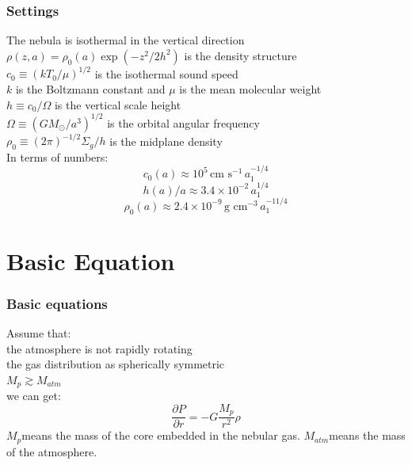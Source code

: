 \documentclass{beamer}
\begin{document}
\begin{frame}
\frametitle{Settings}
The nebula is isothermal in the vertical direction\\ 
$\rho(z,a) = \rho_0(a) \exp(-z^2/2h^2)$ is the density structure\\ 
$c_0 \equiv (kT_0/\mu)^{1/2}$ is the isothermal sound speed\\ 
$k$ is the Boltzmann constant and $\mu$ is the mean molecular weight\\ 
$h \equiv c_0/\Omega$ is the vertical scale height\\ 
$\Omega \equiv (GM_\odot/a^3)^{1/2}$ is the orbital angular frequency\\ 
$\rho_0 \equiv (2\pi)^{-1/2}\Sigma_g/h$ is the midplane density\\
In terms of numbers:
\begin{equation}
c_0(a) \approx 10^5 \, \text{cm s}^{-1} \, a_1^{-1/4}
\end{equation}
\begin{equation}
h(a)/a \approx 3.4 \times 10^{-2} \, a_1^{1/4}
\end{equation}
\begin{equation}
\rho_0(a) \approx 2.4 \times 10^{-9} \, \text{g cm}^{-3} \, a_1^{-11/4}
\end{equation}
\end{frame}

\section{Basic Equation}
\begin{frame}
\frametitle{Basic equations}
Assume that:\\
the atmosphere is not rapidly rotating\\
the gas distribution as spherically symmetric\\
$M_p \gtrsim M_{atm}$\\
we can get:
\begin{equation}
\frac{\partial P}{\partial r} =  -G\frac{M_p}{r^2}\rho
\end{equation}
$M_p$means the mass of the core embedded in the nebular gas.
$M_{atm}$means the mass of the atmosphere.
\end{frame}
\end{document}
